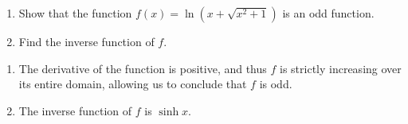 \begin{exercise}
	{\color{white}{content...}}
	\renewcommand{\labelenumi}{(\alph{enumi})}
	\begin{enumerate}
		\item Show that the function $f\left(x\right)=\ln\left(x+\sqrt{x^2+1}\right)$ is an odd function.
		\item Find the inverse function of $f$.
	\end{enumerate}
\end{exercise}
\begin{solution}
	{\color{white}{content...}}
	\renewcommand{\labelenumi}{(\alph{enumi})}
	\begin{enumerate}
		\item The derivative of the function is positive, and thus $f$ is strictly increasing over its entire domain, allowing us to conclude that $f$ is odd.
		\item The inverse function of $f$ is $\sinh x$.
	\end{enumerate}
\end{solution}
